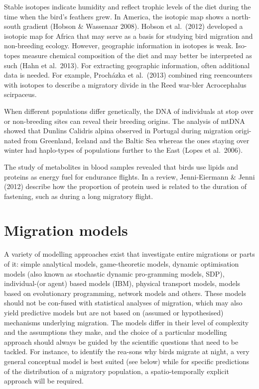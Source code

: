 \documentclass[
]{book}
\begin{document}
Stable isotopes indicate humidity and reflect trophic levels of the diet during the time when the bird's feathers grew. In America, the isotopic map shows a north-south gradient (Hobson \& Wassenaar 2008). Hobson et al.~(2012) developed a isotopic map for Africa that may serve as a basis for studying bird migration and non-breeding ecology. However, geographic information in isotopes is weak. Iso-topes measure chemical composition of the diet and may better be interpreted as such (Hahn et al.~2013). For extracting geographic information, often additional data is needed. For example, Procházka et al.~(2013) combined ring reencounters with isotopes to describe a migratory divide in the Reed war-bler Acrocephalus scirpaceus.

When different populations differ genetically, the DNA of individuals at stop over or non-breeding sites can reveal their breeding origins.
The analysis of mtDNA showed that Dunlins Calidris alpina observed in Portugal during migration origi-nated from Greenland, Iceland and the Baltic Sea whereas the ones staying over winter had haplo-types of populations further to the East (Lopes et al.~2006).

The study of metabolites in blood samples revealed that birds use lipids and proteins as energy fuel for endurance flights. In a review, Jenni-Eiermann \& Jenni (2012) describe how the proportion of protein used is related to the duration of fastening, such as during a long migratory flight.

\hypertarget{migration-models}{%
\chapter{Migration models}\label{migration-models}}

A variety of modelling approaches exist that investigate entire migrations or parts of it: simple analytical models, game-theoretic models, dynamic optimisation models (also known as stochastic dynamic pro-gramming models, SDP), individual-(or agent) based models (IBM), physical transport models, models based on evolutionary programming, network models and others. These models should not be con-fused with statistical analyses of migration, which may also yield predictive models but are not based on (assumed or hypothesised) mechanisms underlying migration. The models differ in their level of complexity and the assumptions they make, and the choice of a particular modelling approach should always be guided by the scientific questions that need to be tackled. For instance, to identify the rea-sons why birds migrate at night, a very general conceptual model is best suited (see below) while for specific predictions of the distribution of a migratory population, a spatio-temporally explicit approach will be required.
\end{document}
